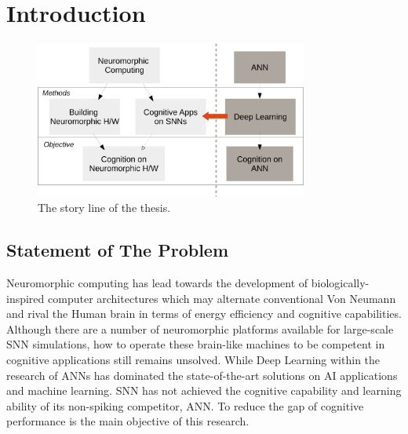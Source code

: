 \chapter{Introduction}
\label{cha:intro}

\begin{figure}[htb!]
	\centering
	\includegraphics[width=0.8\textwidth]{pics_intro/intro.pdf}
	\caption{The story line of the thesis.}
	\label{fig:intro}
\end{figure}









\section{Statement of The Problem}
\label{sec:problem}
Neuromorphic computing has lead towards the development of biologically-inspired computer architectures which may alternate conventional Von Neumann and rival the Human brain in terms of energy efficiency and cognitive capabilities.
Although there are a number of neuromorphic platforms available for large-scale SNN simulations, how to operate these brain-like machines to be competent in cognitive applications still remains unsolved.
While Deep Learning within the research of ANNs has dominated the state-of-the-art solutions on AI applications and machine learning.
SNN has not achieved the cognitive capability and learning ability of its non-spiking competitor, ANN.
To reduce the gap of cognitive performance is the main objective of this research.



